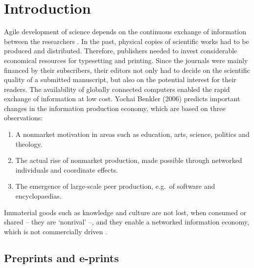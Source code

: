 \documentclass[10pt,fleqn]{wlpeerj}
\providecommand{\tightlist}{%
  \setlength{\itemsep}{0pt}\setlength{\parskip}{0pt}}
\begin{document}
\section{Introduction}\label{introduction}

Agile
development
of
science
depends
on
the
continuous
exchange
of
information
between
the
researchers
\citep{woelfle_open_2011}.
In
the
past,
physical
copies
of
scientific
works
had
to be
produced
and
distributed.
Therefore,
publishers
needed
to
invest
considerable
economical
resources
for
typesetting
and
printing.
Since
the
journals
were
mainly
financed
by
their
subscribers,
their
editors
not
only
had
to
decide
on
the
scientific
quality
of a
submitted
manuscript,
but
also
on
the
potential
interest
for
their
readers.
The
availability
of
globally
connected
computers
enabled
the
rapid
exchange
of
information
at
low
cost.
Yochai
Benkler
(2006)
predicts
important
changes
in
the
information
production
economy,
which
are
based
on
three
observations:

\begin{enumerate}
\def\labelenumi{\arabic{enumi}.}
\tightlist
\item
  A
  nonmarket
  motivation
  in
  areas
  such
  as
  education,
  arts,
  science,
  politics
  and
  theology.
\item
  The
  actual
  rise
  of
  nonmarket
  production,
  made
  possible
  through
  networked
  individuals
  and
  coordinate
  effects.
\item
  The
  emergence
  of
  large-scale
  peer
  production,
  e.g.~of
  software
  and
  encyclopaedias.
\end{enumerate}

Immaterial
goods
such
as
knowledge
and
culture
are
not
lost,
when
consumed
or
shared
--
they
are
`nonrival'
--,
and
they
enable
a
networked
information
economy,
which
is
not
commercially
driven
\citep{benkler_wealth_2006}.

\subsection{Preprints
and
e-prints}\label{preprints-and-e-prints}
\end{document}
